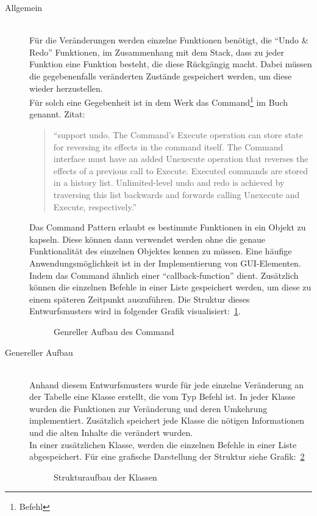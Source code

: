 \begin{description}
\item[Allgemein] \hfill\\
Für die Veränderungen werden einzelne Funktionen benötigt, die ``Undo \& Redo'' Funktionen, im Zusammenhang mit dem Stack, dass zu jeder Funktion eine Funktion besteht, die diese Rückgängig macht. Dabei müssen die gegebenenfalls veränderten Zustände gespeichert werden, um diese wieder herzustellen. \\
Für solch eine Gegebenheit ist in dem Werk das Command\footnote{Befehl} im Buch genannt.
Zitat: 
\begin{quote}
``support undo. The Command's Execute operation can store state for reversing
its effects in the command itself. The Command interface must have an added
Unexecute operation that reverses the effects of a previous call to Execute.
Executed commands are stored in a history list. Unlimited-level undo and
redo is achieved by traversing this list backwards and forwards calling
Unexecute and Execute, respectively.'' ~\cite{Gamma1994}
\end{quote}

Das Command Pattern erlaubt es bestimmte Funktionen in ein Objekt zu kapseln. Diese können dann verwendet werden ohne die genaue Funktionalität des einzelnen Objektes kennen zu müssen.
Eine häufige Anwendungsmöglichkeit ist in der Implementierung von GUI-Elementen. Indem das Command ähnlich einer ``callback-function'' dient. Zusätzlich können die einzelnen Befehle in einer Liste gespeichert werden, um diese zu einem späteren Zeitpunkt auszuführen.
Die Struktur dieses Entwurfsmusters wird in folgender Grafik visualisiert:~\ref{pic:struct_cmd_gof}.

\begin{figure}[ht]
        \centering
        \caption{Genreller Aufbau des Command}
        \label{pic:struct_cmd_gof}
\end{figure}

\item[Genereller Aufbau] \hfill\\
Anhand diesem Entwurfsmusters wurde für jede einzelne Veränderung an der Tabelle eine Klasse erstellt, die vom Typ Befehl ist. In jeder Klasse wurden die Funktionen zur Veränderung und deren Umkehrung implementiert. Zusätzlich speichert jede Klasse die nötigen Informationen und die alten Inhalte die verändert wurden. \\
In einer zusätzlichen Klasse, werden die einzelnen Befehle in einer Liste abgespeichert.
Für eine grafische Darstellung der Struktur siehe Grafik:~\ref{pic:struct_cmd_classes}
\begin{figure}[ht]
        \centering
        \caption{Strukturaufbau der Klassen}
        \label{pic:struct_cmd_classes}
\end{figure}


\end{description}
